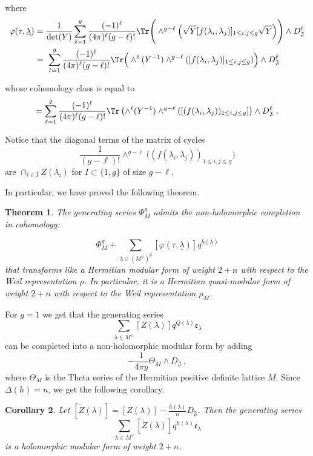 \documentclass[11pt,letterpaper,english]{amsart}
\numberwithin{equation}{subsection}
\numberwithin{equation}{section}
\newcommand\fJ{{\mathfrak J}}
\theoremstyle{plain}
\newtheorem{theorem}{Theorem}[section]
\newtheorem{corollary}[theorem]{Corollary}
\theoremstyle{remark}
\begin{document}
where \begin{align*}
\varphi(\tau,\underline{\lambda})&=\frac{1}{\det(Y)}\sum_{\ell=1}^{g}\frac{(-1)^\ell}{(4\pi)^\ell(g-\ell)!}\Tr\Bigg(\wedge^{g-\ell}\Big(\sqrt{Y}[f(\lambda_i,\lambda_j)]_{1\leq i,j\leq g}\sqrt{Y}\Big)\Bigg)\wedge D_{\fJ}^\ell\\
&= ~\sum_{\ell=1}^{g}\frac{(-1)^\ell}{(4\pi)^\ell(g-\ell)!} \Tr\Big(\wedge^{\ell}(Y^{-1})\wedge^{g-\ell}([f(\lambda_i,\lambda_j)]_{1\leq i,j\leq g})\Big)\wedge D_{\fJ}^\ell
\end{align*}

whose cohomology class is equal to
\begin{align*}
[\varphi(\tau,\underline{\lambda})]=\sum_{\ell=1}^{g}\frac{(-1)^\ell}{(4\pi)^\ell(g-\ell)!} \Tr\left(\wedge^{\ell}(Y^{-1})\wedge^{g-\ell}([(f(\lambda_i,\lambda_j))_{1\leq i,j\leq g}]\right)\wedge D_{\fJ}^\ell~.
\end{align*}

Notice that the diagonal terms of the matrix of cycles \[\frac{1}{(g-\ell)!}\wedge^{g-\ell}\Big((f(\lambda_i,\lambda_j))_{1\leq i,j\leq g}\Big)\] are $\cap _{i\in I}Z(\lambda_{i})$ for $I \subset\{1,g\}$ of size $g-\ell$.

In particular, we have proved the following theorem.
\begin{theorem}\label{t:completions-of-theta-series}
     The generating series $\Phi_{M}^g$ admits the non-holomorphic completion in cohomology:
     
     \[\Phi_{M}^g+\sum_{\underline{\lambda}\in (M^{\vee})^g}[\varphi(\tau, \underline{\lambda})] q^{h(\underline{\lambda})}\]
     that transforms like a Hermitian modular form of weight $2+n$ with respect to the Weil representation $\rho$. In particular, it is a Hermitian quasi-modular form of weight $2+n$ with respect to the Weil representation $\rho_M$.
\end{theorem}


For $g=1$ we get that the generating series \[\sum_{\lambda\in M^\vee}[Z(\lambda)]q^{Q(\lambda)} \mathfrak e_\lambda\] can be completed into a non-holomorphic modular form by adding \[-\frac{1}{4\pi y}\Theta_M\wedge D_{\fJ}~,\] where $\Theta_M$ is the Theta series of the Hermitian positive definite lattice $M$. Since $\Delta(h)=n$, we get the following corollary.
\begin{corollary}\label{c:corrections-codim-1}
Let $[\widetilde{Z}(\lambda)]=[Z(\lambda)]-\frac{h(\lambda)}{n}D_\fJ$. Then the generating series \[\sum_{\lambda\in M^\vee}[\widetilde{Z}(\lambda)]q^{h(\lambda)}\mathfrak e_\lambda\]
is a holomorphic modular form of weight $2+n$.
\end{corollary}
\end{document}
